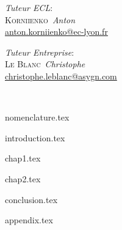 \documentclass[%
    paper=A4,               %
    twoside=true,           %
    openany,                %
    chapterprefix=true,     %
    12pt,                   %
    headings=normal,        %
    bibliography=totoc,     %
    titlepage=on,           %
    captions=tableabove,    %
    draft=false             %
]{book}%
\makeatletter
\newcommand{\schoolTutorFirstName}{Anton}
\newcommand{\schoolTutorLastName}{Korniienko}
\newcommand{\schoolTutorEmail}{anton.korniienko@ec-lyon.fr}
\newcommand{\companyTutorFirstName}{Christophe}
\newcommand{\companyTutorLastName}{Le Blanc}
\newcommand{\companyTutorEmail}{christophe.leblanc@asygn.com}
\makeatother
\begin{document}
\begin{titlepage}
    \begin{minipage}{0.4\textwidth}
        \begin{flushleft}
            \emph{Tuteur ECL}:\\
            {\scshape \schoolTutorLastName{}}~\textit{\schoolTutorFirstName{}}\\
            \href{mailto:\schoolTutorEmail}{\schoolTutorEmail}\\
        \end{flushleft}
    \end{minipage}
    \hfill
    \begin{minipage}{0.4\textwidth}
        \begin{flushright}
            \emph{Tuteur Entreprise}: \\
            {\scshape \companyTutorLastName{}}~\textit{\companyTutorFirstName{}}\\
            \href{mailto:\companyTutorEmail}{\companyTutorEmail}\\
        \end{flushright}
    \end{minipage}\\[2.0\baselineskip]
\end{titlepage}

\tableofcontents{} %
\listoffigures{} %
{nomenclature.tex}


\mainmatter%

{introduction.tex}

{chap1.tex}

{chap2.tex}

{conclusion.tex}



\begin{appendices}
{appendix.tex}
\end{appendices}


\backmatter%
\newpage
\printbibliography[
    heading=bibintoc
]
\end{document}
